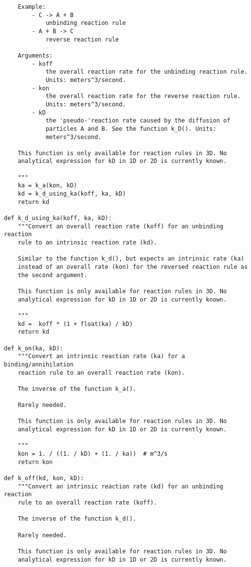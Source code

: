 \documentclass[a4paper,10pt]{article}
\begin{document}
\begin{verbatim}
    Example:
        - C -> A + B
            unbinding reaction rule
        - A + B -> C
            reverse reaction rule

    Arguments:
        - koff
            the overall reaction rate for the unbinding reaction rule.  
            Units: meters^3/second.
        - kon
            the overall reaction rate for the reverse reaction rule. 
            Units: meters^3/second.
        - kD
            the 'pseudo-'reaction rate caused by the diffusion of 
            particles A and B. See the function k_D(). Units: 
            meters^3/second.

    This function is only available for reaction rules in 3D. No 
    analytical expression for kD in 1D or 2D is currently known. 

    """
    ka = k_a(kon, kD)
    kd = k_d_using_ka(koff, ka, kD)
    return kd

def k_d_using_ka(koff, ka, kD):
    """Convert an overall reaction rate (koff) for an unbinding reaction 
    rule to an intrinsic reaction rate (kd).

    Similar to the function k_d(), but expects an intrinsic rate (ka) 
    instead of an overall rate (kon) for the reversed reaction rule as 
    the second argument.

    This function is only available for reaction rules in 3D. No 
    analytical expression for kD in 1D or 2D is currently known. 

    """
    kd =  koff * (1 + float(ka) / kD)
    return kd

def k_on(ka, kD):
    """Convert an intrinsic reaction rate (ka) for a binding/annihilation 
    reaction rule to an overall reaction rate (kon).

    The inverse of the function k_a().
    
    Rarely needed.

    This function is only available for reaction rules in 3D. No 
    analytical expression for kD in 1D or 2D is currently known. 

    """
    kon = 1. / ((1. / kD) + (1. / ka))  # m^3/s
    return kon

def k_off(kd, kon, kD):
    """Convert an intrinsic reaction rate (kd) for an unbinding reaction 
    rule to an overall reaction rate (koff).

    The inverse of the function k_d().

    Rarely needed.

    This function is only available for reaction rules in 3D. No 
    analytical expression for kD in 1D or 2D is currently known. 


\end{verbatim}
\end{document}
